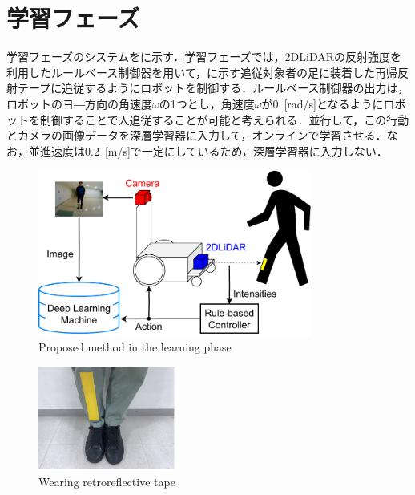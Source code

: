 
\section{学習フェーズ}

  学習フェーズのシステムをに示す．学習フェーズでは，2DLiDARの反射強度を利用したルールベース制御器を用いて，に示す追従対象者の足に装着した再帰反射テープに追従するようにロボットを制御する．ルールベース制御器の出力は，ロボットのヨ―方向の角速度$\omega$の1つとし，角速度$\omega$が0 \,[rad/s]となるようにロボットを制御することで人追従することが可能と考えられる．並行して，この行動とカメラの画像データを深層学習器に入力して，オンラインで学習させる．なお，並進速度は0.2 \,[m/s]で一定にしているため，深層学習器に入力しない．

  \begin{figure}[h]
    \centering
    \includegraphics[width=9cm] {images/pdf/RobotGuidance_learning_system}
    \captionsetup{justification=raggedright} %
    \caption{Proposed method in the learning phase}
    \label{Fig:RobotGuidance_learning_system}
  \end{figure}

  \begin{figure}[h]
    \centering
    \includegraphics[width=4.5cm] {images/pdf/RobotGuidance_learning_phase_leg}
    \captionsetup{justification=raggedright} %
    \caption{Wearing retroreflective tape}
    \label{Fig:RobotGuidance_learning_phase_leg}
  \end{figure}

\newpage
